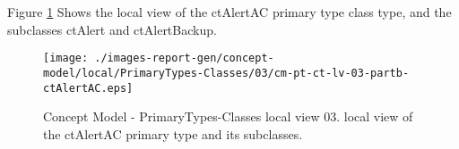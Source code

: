 Figure \ref{fig:lu.uni.lassy.excalibur.examples.icrash-CM-view-local-PrimaryTypes-Classes-03} Shows the local view of the ctAlertAC primary type class type, and
the subclasses ctAlert and ctAlertBackup.



\begin{figure}[htbp] 
\label{fig:lu.uni.lassy.excalibur.examples.icrash-CM}
\begin{center}
\texttt{[image: ./images-report-gen/concept-model/local/PrimaryTypes-Classes/03/cm-pt-ct-lv-03-partb-ctAlertAC.eps]}
\end{center}
\caption[Concept Model - PrimaryTypes-Classes local view 03 - local view of the ctAlertAC primary ]{Concept Model - PrimaryTypes-Classes local view 03. local view of the ctAlertAC primary type and its subclasses.}
\label{fig:lu.uni.lassy.excalibur.examples.icrash-CM-view-local-PrimaryTypes-Classes-03}
\end{figure}
\vspace{0.5cm} 
